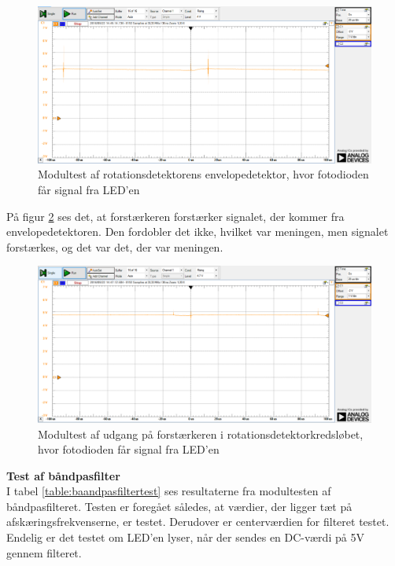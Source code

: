 \begin{figure}[H]
	\centering
	\includegraphics[width=\textwidth]{Test/images/AffyringTest/KanSe/envelopedetektor}
	\caption{Modultest af rotationsdetektorens envelopedetektor, hvor fotodioden får signal fra LED'en}
	\label{fig:envdetKanSe}
\end{figure}

\noindent På figur \ref{fig:forstaerkerudgangKanSe} ses det, at forstærkeren forstærker signalet, der kommer fra envelopedetektoren. Den fordobler det ikke, hvilket var meningen, men signalet forstærkes, og det var det, der var meningen. 

\begin{figure}[H]
	\centering
	\includegraphics[width=\textwidth]{Test/images/AffyringTest/KanSe/forstaerkerudgang}
	\caption{Modultest af udgang på forstærkeren i rotationsdetektorkredsløbet, hvor fotodioden får signal fra LED'en}
	\label{fig:forstaerkerudgangKanSe}
\end{figure}

\noindent \textbf{Test af båndpasfilter} \\
\noindent I tabel \ref{table:baandpasfiltertest} ses resultaterne fra modultesten af båndpasfilteret. Testen er foregået således, at værdier, der ligger tæt på afskæringsfrekvenserne, er testet. Derudover er centerværdien for filteret testet. Endelig er det testet om LED'en lyser, når der sendes en DC-værdi på 5V gennem filteret. 

